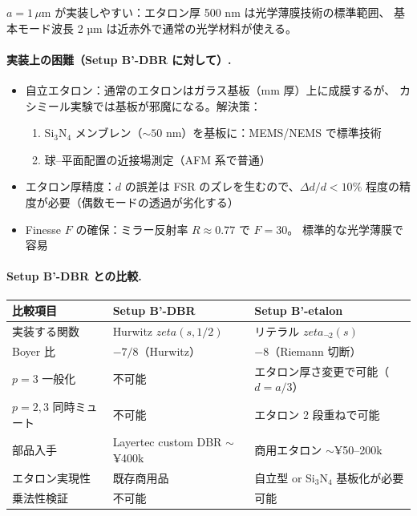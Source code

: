 \documentclass[11pt,a4paper]{article}
\def\zeta{zeta}%
\def\textbf#1{#1}%
\begin{document}
$a = 1\,\mu$m が実装しやすい：エタロン厚 500 nm は光学薄膜技術の標準範囲、
基本モード波長 2 µm は近赤外で通常の光学材料が使える。

\paragraph{実装上の困難（Setup B'-DBR に対して）.}
\begin{itemize}
\item \textbf{自立エタロン}：通常のエタロンはガラス基板（mm 厚）上に成膜するが、
  カシミール実験では基板が邪魔になる。解決策：
  \begin{enumerate}
  \item \textbf{Si$_3$N$_4$ メンブレン（$\sim 50$ nm）を基板に}：MEMS/NEMS で標準技術
  \item \textbf{球--平面配置}の近接場測定（AFM 系で普通）
  \end{enumerate}
\item \textbf{エタロン厚精度}：$d$ の誤差は FSR のズレを生むので、$\Delta d/d < 10\%$
  程度の精度が必要（偶数モードの透過が劣化する）
\item \textbf{Finesse $F$ の確保}：ミラー反射率 $R \approx 0.77$ で $F = 30$。
  標準的な光学薄膜で容易
\end{itemize}

\paragraph{Setup B'-DBR との比較.}
\begin{center}
\begin{tabular}{p{}p{}p{}}
\toprule
比較項目 & Setup B'-DBR & \textbf{Setup B'-etalon} \\
\midrule
実装する関数 & Hurwitz $\zeta(s, 1/2)$ & \textbf{リテラル $\zeta_{\neg 2}(s)$} \\
Boyer 比 & $-7/8$（Hurwitz） & \textbf{$-8$（Riemann 切断）} \\
$p=3$ 一般化 & 不可能 & \textbf{エタロン厚さ変更で可能}（$d = a/3$）\\
$p=2,3$ 同時ミュート & 不可能 & \textbf{エタロン 2 段重ねで可能} \\
部品入手 & Layertec custom DBR $\sim$¥400k & \textbf{商用エタロン $\sim$¥50--200k} \\
エタロン実現性 & 既存商用品 & 自立型 or Si$_3$N$_4$ 基板化が必要 \\
乗法性検証 & 不可能 & \textbf{可能} \\
\bottomrule
\end{tabular}
\end{center}
\end{document}
